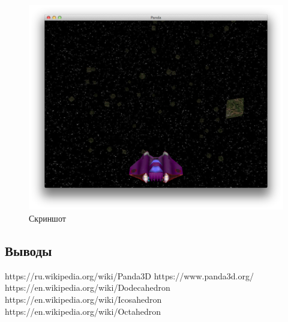 \documentclass[12pt]{article}
\begin{document}
\begin{figure}[!htb]
  \centering
    \includegraphics[scale=0.5]{pics/game.png}
   \caption{Скриншот}
    \label{fig:game}
\end{figure}

\subsection*{Выводы}

\begin{thebibliography}{}
 https://ru.wikipedia.org/wiki/Panda3D
 https://www.panda3d.org/
 https://en.wikipedia.org/wiki/Dodecahedron
 https://en.wikipedia.org/wiki/Icosahedron
 https://en.wikipedia.org/wiki/Octahedron
\end{thebibliography}
\end{document}
